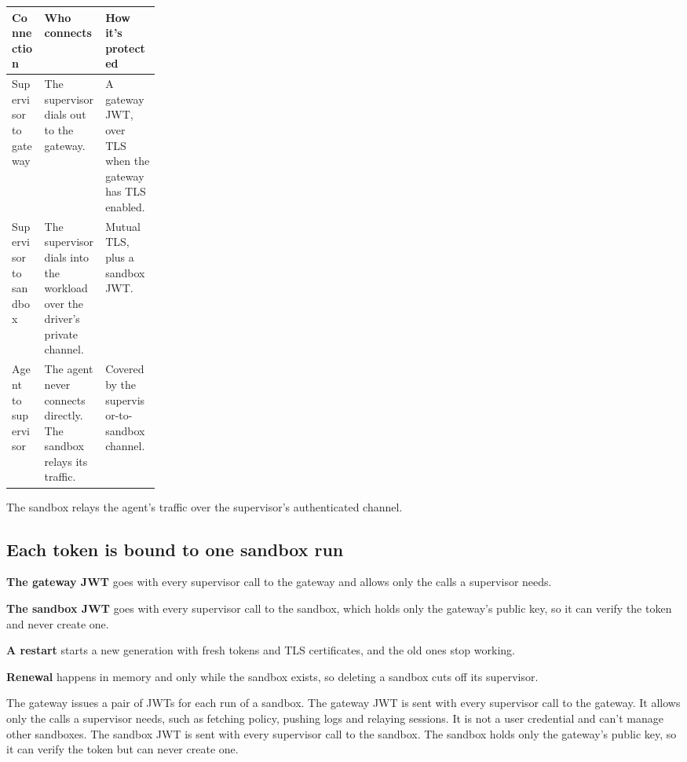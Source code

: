 \begin{center}\footnotesize
\begin{tabularx}{\linewidth}{L{0.22\linewidth}XX}
\toprule
\textbf{Connection} & \textbf{Who connects} & \textbf{How it's protected} \\
\midrule
Supervisor to gateway & The supervisor dials out to the gateway. & A gateway JWT, over TLS when the gateway has TLS enabled. \\
Supervisor to sandbox & The supervisor dials into the workload over the driver's private channel. & Mutual TLS, plus a sandbox JWT. \\
Agent to supervisor & The agent never connects directly. The sandbox relays its traffic. & Covered by the supervisor-to-sandbox channel. \\
\bottomrule
\end{tabularx}
\end{center}

\begin{takeaway}The sandbox relays the agent's traffic over the supervisor's authenticated channel.\end{takeaway}

\subsection{Each token is bound to one sandbox run}
\label{sec:it-os-5-3}

\bi
\item \textbf{The gateway JWT} goes with every supervisor call to the gateway and allows only the calls a supervisor needs.
\item \textbf{The sandbox JWT} goes with every supervisor call to the sandbox, which holds only the gateway's public key, so it can verify the token and never create one.
\item \textbf{A restart} starts a new generation with fresh tokens and TLS certificates, and the old ones stop working.
\item \textbf{Renewal} happens in memory and only while the sandbox exists, so deleting a sandbox cuts off its supervisor.
\ei

The gateway issues a pair of JWTs for each run of a sandbox. The gateway JWT is sent with every supervisor call to the gateway. It allows only the calls a supervisor needs, such as fetching policy, pushing logs and relaying sessions. It is not a user credential and can't manage other sandboxes. The sandbox JWT is sent with every supervisor call to the sandbox. The sandbox holds only the gateway's public key, so it can verify the token but can never create one.

